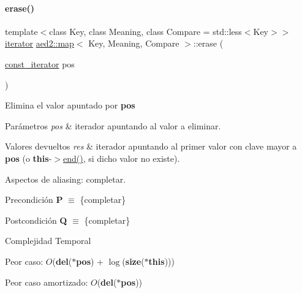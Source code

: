 \mbox{\label{classaed2_1_1map_ad8e796bf9c9c558e5ce6b61e116253fe_ad8e796bf9c9c558e5ce6b61e116253fe}} 
\paragraph{\texorpdfstring{erase()}{erase()}\hspace{0.1cm}{\footnotesize\ttfamily [1/2]}}
{\footnotesize\ttfamily template$<$class Key, class Meaning, class Compare = std\+::less$<$\+Key$>$$>$ \\
\hyperlink{classaed2_1_1map_1_1iterator}{iterator} \hyperlink{classaed2_1_1map}{aed2\+::map}$<$ Key, Meaning, Compare $>$\+::erase (\begin{DoxyParamCaption}\item[{\hyperlink{classaed2_1_1map_1_1const__iterator}{const\+\_\+iterator}}]{pos }\end{DoxyParamCaption})\hspace{0.3cm}{\ttfamily [inline]}}



Elimina el valor apuntado por {\bfseries pos} 


\begin{DoxyParams}{Parámetros}
{\em pos} & iterador apuntando al valor a eliminar. \\
\hline
\end{DoxyParams}

\begin{DoxyRetVals}{Valores devueltos}
{\em res} & iterador apuntando al primer valor con clave mayor a {\bfseries pos} (o {\bfseries this}-\/$>$\hyperlink{classaed2_1_1map_a76023e6a56cb625513e1b5ea028bf983_a76023e6a56cb625513e1b5ea028bf983}{end()}, si dicho valor no existe).\\
\hline
\end{DoxyRetVals}
\begin{DoxyParagraph}{Aspectos de aliasing\+:}
completar.
\end{DoxyParagraph}
\begin{DoxyPrecond}{Precondición}
{\bfseries P} $\equiv$ \{completar\} 
\end{DoxyPrecond}
\begin{DoxyPostcond}{Postcondición}
{\bfseries Q} $\equiv$ \{completar\}
\end{DoxyPostcond}

\begin{DoxyDescription}
\item[Complejidad Temporal]
\begin{DoxyItemize}
\item Peor caso\+: $O$({\bfseries del}({\bfseries $\ast$pos}) + $\log$({\bfseries size}({\bfseries $\ast$this})))
\item Peor caso amortizado\+: $O$({\bfseries del}({\bfseries $\ast$pos})) 
\end{DoxyItemize}
\end{DoxyDescription}

